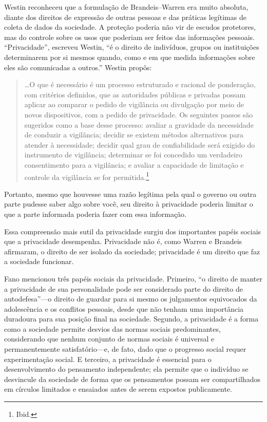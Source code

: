 \documentclass{book}
\begin{document}
Westin reconheceu que a formulação de Brandeis--Warren era muito absoluta, diante
dos direitos de expressão de outras pessoas e das práticas legítimas de coleta
de dados da sociedade. A proteção poderia não vir de escudos protetores, mas
do controle sobre os usos que poderiam ser feitos das informações pessoais.
``Privacidade'', escreveu Westin, ``é o direito de indivíduos, grupos ou instituições
determinarem por si mesmos quando, como e em que medida informações sobre eles
são comunicadas a outros.'' Westin propôs:

\begin{quote}
\ldots O que é necessário é um processo estruturado e racional de ponderação,
com critérios definidos, que as autoridades públicas e privadas possam aplicar
ao comparar o pedido de vigilância ou divulgação por meio de novos
dispositivos, com a pedido de privacidade. Os seguintes passos são
sugeridos como a base desse processo: avaliar a gravidade da necessidade de
conduzir a vigilância; decidir se existem métodos alternativos para atender
à necessidade; decidir qual grau de confiabilidade será exigido do instrumento
de vigilância; determinar se foi concedido um verdadeiro consentimento para a
vigilância; e avaliar a capacidade de limitação e controle da vigilância se
for permitida.\footnote{Ibid.}  
\end{quote}

Portanto, mesmo que houvesse uma razão legítima pela qual o governo ou outra
parte pudesse saber algo sobre você, seu direito à privacidade poderia limitar
o que a parte informada poderia fazer com essa informação.

Essa compreensão mais sutil da privacidade surgiu dos importantes papéis sociais
que a privacidade desempenha. Privacidade não é, como Warren e Brandeis afirmaram,
o direito de ser isolado da sociedade; privacidade é um direito que faz a
sociedade funcionar.

Fano mencionou três papéis sociais da privacidade. Primeiro, ``o direito de manter
a privacidade de sua personalidade pode ser considerado parte do direito de
autodefesa''---o direito de guardar para si mesmo os julgamentos equivocados da
adolescência e os conflitos pessoais, desde que não tenham uma importância
duradoura para sua posição final na sociedade. Segundo, a privacidade é a forma
como a sociedade permite desvios das normas sociais predominantes, considerando
que nenhum conjunto de normas sociais é universal e permanentemente satisfatório---e, 
de fato, dado que o progresso social requer experimentação social. E terceiro,
a privacidade é essencial para o desenvolvimento do pensamento independente; ela
permite que o indivíduo se desvincule da sociedade de forma que os pensamentos
possam ser compartilhados em círculos limitados e ensaiados antes de serem
expostos publicamente.
\end{document}
